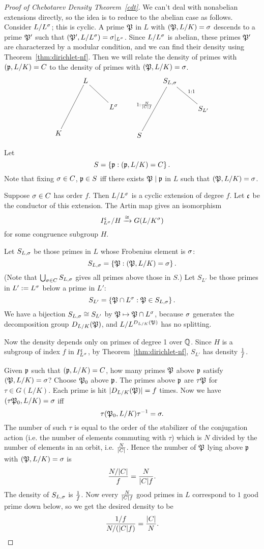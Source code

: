 \begin{proof}[Proof of Chebotarev Density Theorem~\ref{cdt}]
We can't deal with nonabelian extensions directly, so the idea is to reduce to the abelian case as follows. Consider $L/L^{\sigma}$; this is cyclic. A prime $\mathfrak{P}$ in $L$ with $(\mathfrak{P},L/K)=\sigma$ descends to a prime $\mathfrak{P}'$ such that $(\mathfrak{P}',L/L^{\sigma})=\sigma|_{L^{\sigma}}$. Since $L/L^{\sigma}$ is abelian, these primes $\mathfrak{P}'$ are characterzed by a modular condition, and we can find their density using Theorem~\ref{thm:dirichlet-nf}. Then we will relate the density of primes with $(\mathfrak{p},L/K)=C$ to the density of primes with $(\mathfrak{P},L/K)=\sigma$.
\[
\xymatrix{
& L \ar@{-}[ldd]\ar@{-}[rd] &\\
& & L^{\si}\\
K& & 
}
\qquad
\xymatrix{
& S_{L,\si} \ar@{-}[rd]^{1:1} &\\
& & S_{L'}\\
S\ar@{-}[ruu]^{1:\fc{N}{|C|f}}& & 
}
\]

Let
\[
S=\left\{{\mathfrak{p}}:{(\mathfrak{p},L/K)=C}\right\}.
\]
Note that fixing $\sigma\in C$, $\mathfrak{p}\in S$ iff there exists $\mathfrak{P}\mid \mathfrak{p}$ in $L$ such that $(\mathfrak{P},L/K)=\sigma$. 

Suppose $\sigma\in C$ has order $f$. Then $L/L^{\sigma}$ is a cyclic extension of degree $f$. Let $\mathfrak{c}$ be the conductor of this extension. The Artin map gives an isomorphism
\[
I_{L^{\sigma}}^{\mathfrak{c}}/H\xrightarrow{\cong} G(L/K^{\sigma})
\]
for some congruence subgroup $H$.

Let $S_{L,\sigma}$ be those primes in $L$ whose Frobenius element is $\sigma$:
\[
S_{L,\sigma}=\left\{{\mathfrak{P}}:{(\mathfrak{P},L/K)=\sigma}\right\}.
\]
(Note that $\bigcup_{\sigma\in C} S_{L,\sigma}$ gives all primes above those in $S$.) Let $S_{L'}$ be those primes in $L':=L^{\sigma}$ below a prime in $L'$:
\[
S_{L'}=\left\{{\mathfrak{P}\cap L^{\sigma}}:{\mathfrak{P}\in S_{L,\sigma}}\right\}.
\]
We have a bijection $S_{L,\sigma}\cong S_{L'}$ by $\mathfrak{P}\mapsto \mathfrak{P}\cap L^{\sigma}$, because $\sigma$ generates the decomposition group $D_{L/K}(\mathfrak{P})$, and $L/L^{D_{L/K}(\mathfrak{P})}$ has no splitting.

Now the density depends only on primes of degree 1 over $\mathbb{Q}$. Since $H$ is a subgroup of index $f$ in $I^{\mathfrak{c}}_{L^{\sigma}}$, by Theorem~\ref{thm:dirichlet-nf}, $S_{L'}$ has density $\frac{1}{f}$.

Given $\mathfrak{p}$ such that $(\mathfrak{p},L/K)=C$, how many primes $\mathfrak{P}$ above $\mathfrak{p}$ satisfy $(\mathfrak{P},L/K)=\sigma$? Choose $\mathfrak{P}_0$ above $\mathfrak{p}$. The primes above $\mathfrak{p}$ are $\tau\mathfrak{P}$ for $\tau\in G(L/K)$. Each prime is hit $|D_{L/K}(\mathfrak{P})|=f$ times. Now we have $(\tau\mathfrak{P}_0,L/K)=\sigma$ iff
\[
\tau (\mathfrak{P}_0,L/K)\tau^{-1}=\sigma.
\]
The number of such $\tau$ is equal to the order of the stabilizer of the conjugation action (i.e. the number of elements commuting with $\tau$) which is $N$ divided by the number of elements in an orbit, i.e. $\frac{N}{|C|}$. Hence the number of $\mathfrak{P}$ lying above $\mathfrak{p}$ with $(\mathfrak{P},L/K)=\sigma$ is
\[
\frac{N/|C|}{f}=\frac{N}{|C|f}.
\]
The density of $S_{L,\sigma}$ is $\frac{1}{f}$. Now every $\frac{N}{|C|f}$ good primes in $L$ correspond to $1$ good prime down below, so we get the desired density to be
\[
\frac{1/f}{N/(|C|f)}=\frac{|C|}{N}.
\]
\end{proof}

